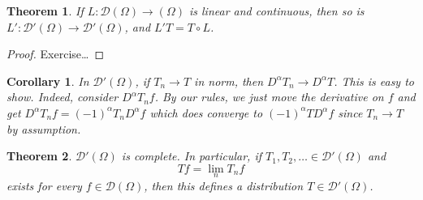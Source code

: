 \documentclass[letterpaper,twoside,11pt]{article}
\theoremstyle{mystyle}
\newtheorem{theorem}{Theorem}[section]
\newtheorem{corollary}{Corollary}[theorem]
\newcommand{\DD}{\mathcal D}
\begin{document}
\begin{tcolorbox}[colback=red!5!white,colframe=red!75!black]
\begin{theorem}
  If $L:\DD\left( \Omega \right) \to \left( \Omega    \right)$ is linear and continuous, then so is $L' : \DD'(\Omega) \to \DD'(\Omega)$, and $L'T = T\circ L$. 
\end{theorem}
\end{tcolorbox}

\begin{proof}
  Exercise\dots
\end{proof}

\begin{corollary}
  In $\DD'(\Omega)$, if $T_n \to T$ in norm, then $D^\alpha T_n \to D^\alpha T$. This is easy to show. Indeed, consider $D^\alpha T_n f$. By our rules, we just move the derivative on $f$ and get $D^\alpha T_n f = \left( -1 \right)^\alpha T_n D^\alpha f$ which does converge to $ \left( -1 \right)^\alpha T D^\alpha f$ since $T_n \to T$ by assumption. 
\end{corollary}

\begin{tcolorbox}[colback=red!5!white,colframe=red!75!black]
\begin{theorem}
  $\DD'(\Omega) $ is complete. In particular, if $T_1, T_2, \dots \in \DD'(\Omega)$ and 
  \[Tf = \lim_n T_n f\] exists for every $f \in \DD(\Omega)$, then this defines a distribution $T \in \DD'(\Omega)$. 
\end{theorem}
\end{tcolorbox}
\end{document}
